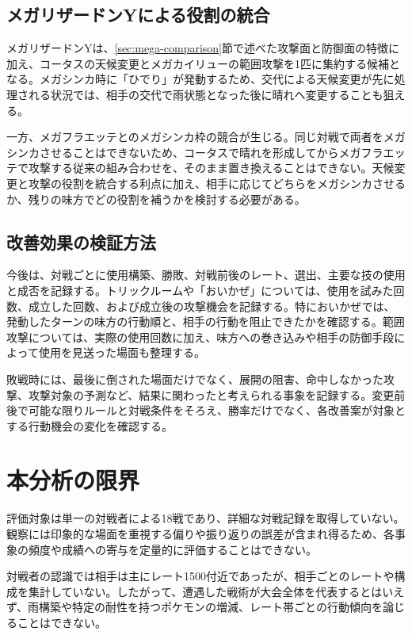 \documentclass[a4paper,10pt]{ltjsarticle}
\begin{document}
\subsection{メガリザードンYによる役割の統合}

メガリザードンYは、\ref{sec:mega-comparison}節で述べた攻撃面と防御面の特徴に加え、コータスの天候変更とメガカイリューの範囲攻撃を1匹に集約する候補となる。メガシンカ時に「ひでり」が発動するため、交代による天候変更が先に処理される状況では、相手の交代で雨状態となった後に晴れへ変更することも狙える。

一方、メガフラエッテとのメガシンカ枠の競合が生じる。同じ対戦で両者をメガシンカさせることはできないため、コータスで晴れを形成してからメガフラエッテで攻撃する従来の組み合わせを、そのまま置き換えることはできない。天候変更と攻撃の役割を統合する利点に加え、相手に応じてどちらをメガシンカさせるか、残りの味方でどの役割を補うかを検討する必要がある。

\subsection{改善効果の検証方法}

今後は、対戦ごとに使用構築、勝敗、対戦前後のレート、選出、主要な技の使用と成否を記録する。トリックルームや「おいかぜ」については、使用を試みた回数、成立した回数、および成立後の攻撃機会を記録する。特においかぜでは、発動したターンの味方の行動順と、相手の行動を阻止できたかを確認する。範囲攻撃については、実際の使用回数に加え、味方への巻き込みや相手の防御手段によって使用を見送った場面も整理する。

敗戦時には、最後に倒された場面だけでなく、展開の阻害、命中しなかった攻撃、攻撃対象の予測など、結果に関わったと考えられる事象を記録する。変更前後で可能な限りルールと対戦条件をそろえ、勝率だけでなく、各改善案が対象とする行動機会の変化を確認する。

\section{本分析の限界}

評価対象は単一の対戦者による18戦であり、詳細な対戦記録を取得していない。観察には印象的な場面を重視する偏りや振り返りの誤差が含まれ得るため、各事象の頻度や成績への寄与を定量的に評価することはできない。

対戦者の認識では相手は主にレート1500付近であったが、相手ごとのレートや構成を集計していない。したがって、遭遇した戦術が大会全体を代表するとはいえず、雨構築や特定の耐性を持つポケモンの増減、レート帯ごとの行動傾向を論じることはできない。
\end{document}
